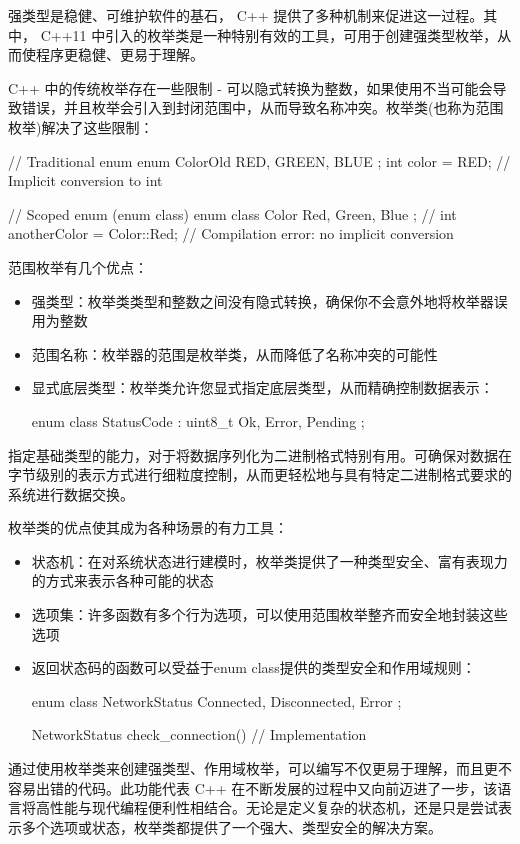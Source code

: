 强类型是稳健、可维护软件的基石， C++ 提供了多种机制来促进这一过程。其中， C++11 中引入的枚举类是一种特别有效的工具，可用于创建强类型枚举，从而使程序更稳健、更易于理解。


C++ 中的传统枚举存在一些限制 - 可以隐式转换为整数，如果使用不当可能会导致错误，并且枚举会引入到封闭范围中，从而导致名称冲突。枚举类(也称为范围枚举)解决了这些限制：

\begin{cpp}
// Traditional enum
enum ColorOld { RED, GREEN, BLUE };
int color = RED; // Implicit conversion to int

// Scoped enum (enum class)
enum class Color { Red, Green, Blue };
// int anotherColor = Color::Red; // Compilation error: no implicit conversion
\end{cpp}


范围枚举有几个优点：

\begin{itemize}
\item
强类型：枚举类类型和整数之间没有隐式转换，确保你不会意外地将枚举器误用为整数

\item
范围名称：枚举器的范围是枚举类，从而降低了名称冲突的可能性

\item
显式底层类型：枚举类允许您显式指定底层类型，从而精确控制数据表示：

\begin{cpp}
enum class StatusCode : uint8_t { Ok, Error, Pending };
\end{cpp}
\end{itemize}

指定基础类型的能力，对于将数据序列化为二进制格式特别有用。可确保对数据在字节级别的表示方式进行细粒度控制，从而更轻松地与具有特定二进制格式要求的系统进行数据交换。


枚举类的优点使其成为各种场景的有力工具：

\begin{itemize}
\item
状态机：在对系统状态进行建模时，枚举类提供了一种类型安全、富有表现力的方式来表示各种可能的状态

\item
选项集：许多函数有多个行为选项，可以使用范围枚举整齐而安全地封装这些选项

\item
返回状态码的函数可以受益于enum class提供的类型安全和作用域规则：

\begin{cpp}
enum class NetworkStatus { Connected, Disconnected, Error };

NetworkStatus check_connection() {
    // Implementation
}
\end{cpp}
\end{itemize}

通过使用枚举类来创建强类型、作用域枚举，可以编写不仅更易于理解，而且更不容易出错的代码。此功能代表 C++ 在不断发展的过程中又向前迈进了一步，该语言将高性能与现代编程便利性相结合。无论是定义复杂的状态机，还是只是尝试表示多个选项或状态，枚举类都提供了一个强大、类型安全的解决方案。














